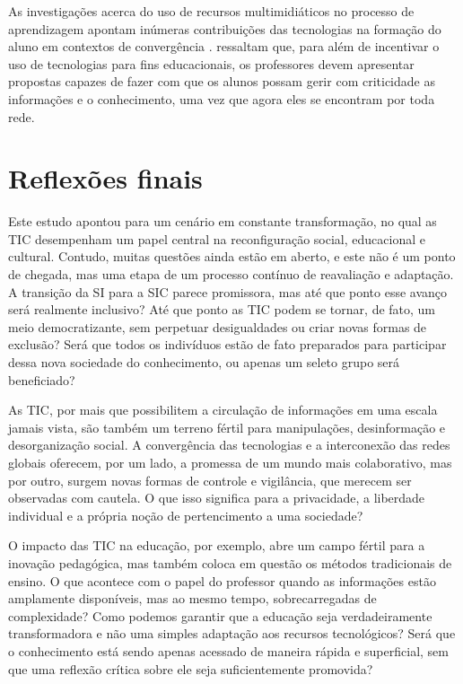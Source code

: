 \documentclass[portuguese]{textolivre}
\begin{document}
As investigações acerca do uso de recursos multimidiáticos no processo
de aprendizagem apontam inúmeras contribuições das tecnologias na
formação do aluno em contextos de convergência \cite{pedro2002}.
\textcite{lisboa2010} ressaltam que, para além de
incentivar o uso de tecnologias para fins educacionais, os professores
devem apresentar propostas capazes de fazer com que os alunos possam
gerir com criticidade as informações e o conhecimento, uma vez que agora
eles se encontram por toda rede.




\section{Reflexões finais}

Este estudo apontou para um cenário em constante transformação, no qual
as TIC desempenham um papel central na reconfiguração social,
educacional e cultural. Contudo, muitas questões ainda estão em aberto,
e este não é um ponto de chegada, mas uma etapa de um processo contínuo
de reavaliação e adaptação. A transição da SI para a SIC parece
promissora, mas até que ponto esse avanço será realmente inclusivo? Até
que ponto as TIC podem se tornar, de fato, um meio democratizante, sem
perpetuar desigualdades ou criar novas formas de exclusão? Será que
todos os indivíduos estão de fato preparados para participar dessa nova
sociedade do conhecimento, ou apenas um seleto grupo será beneficiado?

As TIC, por mais que possibilitem a circulação de informações em uma
escala jamais vista, são também um terreno fértil para manipulações,
desinformação e desorganização social. A convergência das tecnologias e
a interconexão das redes globais oferecem, por um lado, a promessa de um
mundo mais colaborativo, mas por outro, surgem novas formas de controle
e vigilância, que merecem ser observadas com cautela. O que isso
significa para a privacidade, a liberdade individual e a própria noção
de pertencimento a uma sociedade?

O impacto das TIC na educação, por exemplo, abre um campo fértil para a
inovação pedagógica, mas também coloca em questão os métodos
tradicionais de ensino. O que acontece com o papel do professor quando
as informações estão amplamente disponíveis, mas ao mesmo tempo,
sobrecarregadas de complexidade? Como podemos garantir que a educação
seja verdadeiramente transformadora e não uma simples adaptação aos
recursos tecnológicos? Será que o conhecimento está sendo apenas
acessado de maneira rápida e superficial, sem que uma reflexão crítica
sobre ele seja suficientemente promovida?
\end{document}
